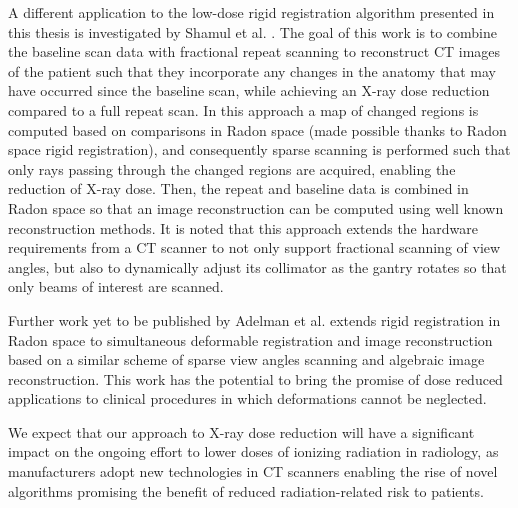 A different application to the low-dose rigid registration algorithm presented in this thesis is investigated by Shamul et al. \cite{shamul2017radon}. The goal of this work is to combine the baseline scan data with fractional repeat scanning to reconstruct CT images of the patient such that they incorporate any changes in the anatomy that may have occurred since the baseline scan, while achieving an X-ray dose reduction compared to a full repeat scan. In this approach a map of changed regions is computed based on comparisons in Radon space (made possible thanks to Radon space rigid registration), and consequently sparse scanning is performed such that only rays passing through the changed regions are acquired, enabling the reduction of X-ray dose. Then, the repeat and baseline data is combined in Radon space so that an image reconstruction can be computed using well known reconstruction methods. It is noted that this approach extends the hardware requirements from a CT scanner to not only support fractional scanning of view angles, but also to dynamically adjust its collimator as the gantry rotates so that only beams of interest are scanned.

Further work yet to be published by Adelman et al. extends rigid registration in Radon space to simultaneous deformable registration and image reconstruction based on a similar scheme of sparse view angles scanning and algebraic image reconstruction. This work has the potential to bring the promise of dose reduced applications to clinical procedures in which deformations cannot be neglected.

We expect that our approach to X-ray dose reduction will have a significant impact on the ongoing effort to lower doses of ionizing radiation in radiology, as manufacturers adopt new technologies in CT scanners enabling the rise of novel algorithms promising the benefit of reduced radiation-related risk to patients.